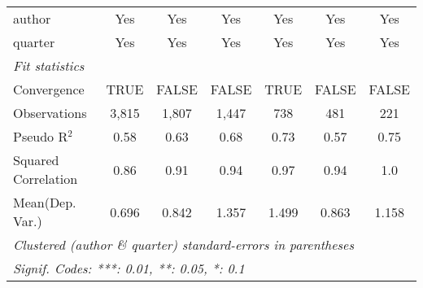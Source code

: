 \begin{tabular}{lcccccc}
   author                                                     & Yes           & Yes          & Yes           & Yes          & Yes           & Yes\\  
   quarter                                                    & Yes           & Yes          & Yes           & Yes          & Yes           & Yes\\  
   \midrule
   \emph{Fit statistics}\\
   Convergence                                                &TRUE           & FALSE        & FALSE         & TRUE         & FALSE         & FALSE\\  
   Observations                                               & 3,815         & 1,807        & 1,447         & 738          & 481           & 221\\  
   Pseudo R$^2$                                               & 0.58          & 0.63         & 0.68          & 0.73         & 0.57          & 0.75\\  
   Squared Correlation                                        & 0.86          & 0.91         & 0.94          & 0.97         & 0.94          & 1.0\\  
Mean(Dep. Var.) & 0.696 & 0.842 & 1.357 & 1.499 & 0.863 & 1.158 \\
   \midrule \midrule
   \multicolumn{7}{l}{\emph{Clustered (author \& quarter) standard-errors in parentheses}}\\
   \multicolumn{7}{l}{\emph{Signif. Codes: ***: 0.01, **: 0.05, *: 0.1}}\\
\end{tabular}
\par\endgroup
